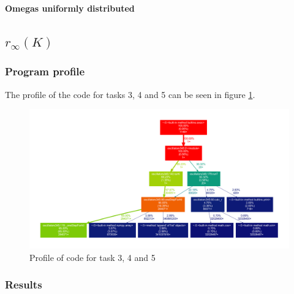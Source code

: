 \documentclass[11pt,a4paper]{article}
\begin{document}
\clearpage
\FloatBarrier
\bigskip\noindent
{\Large\textbf{Omegas uniformly distributed}}
\subsection{$r_{\infty}(K)$}


\subsubsection{Program profile}
The profile of the code for tasks 3, 4 and 5 can be seen in figure \ref{profile345}.
\begin{landscape}
\begin{figure}[p]
	\centering
	\includegraphics[width=26cm]{graphics/profile345.pdf} %
	\caption{Profile of code for task 3, 4 and 5}
	\label{profile345}
\end{figure}
\end{landscape}


\subsubsection{Results}
\end{document}
